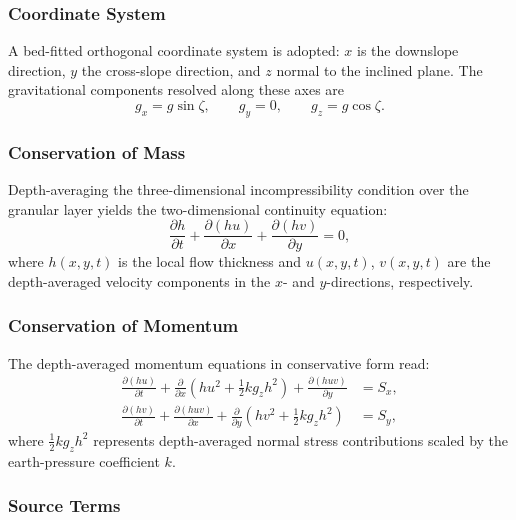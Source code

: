 \documentclass[10pt, conference]{FMFP2023}
\begin{document}
\subsubsection{Coordinate System}

A bed-fitted orthogonal coordinate system is adopted: $x$ is the
downslope direction, $y$ the cross-slope direction, and $z$ normal to
the inclined plane.
The gravitational components resolved along these axes are
\begin{equation}
    g_x = g\sin\zeta, \qquad g_y = 0, \qquad g_z = g\cos\zeta.
    \label{eq:gravity_components}
\end{equation}

\subsubsection{Conservation of Mass}

Depth-averaging the three-dimensional incompressibility condition over
the granular layer yields the two-dimensional continuity equation:
\begin{equation}
    \frac{\partial h}{\partial t}
    + \frac{\partial(hu)}{\partial x}
    + \frac{\partial(hv)}{\partial y} = 0,
    \label{eq:mass_2d}
\end{equation}
where $h(x,y,t)$ is the local flow thickness and $u(x,y,t)$,
$v(x,y,t)$ are the depth-averaged velocity components in the $x$- and
$y$-directions, respectively.

\subsubsection{Conservation of Momentum}

The depth-averaged momentum equations in conservative form read:
\begin{align}
    \frac{\partial(hu)}{\partial t}
    + \frac{\partial}{\partial x}\!\left(hu^2 + \tfrac{1}{2}kg_zh^2\right)
    + \frac{\partial(huv)}{\partial y}
    &= S_x,
    \label{eq:mom_x_2d} \\[4pt]
    \frac{\partial(hv)}{\partial t}
    + \frac{\partial(huv)}{\partial x}
    + \frac{\partial}{\partial y}\!\left(hv^2 + \tfrac{1}{2}kg_zh^2\right)
    &= S_y,
    \label{eq:mom_y_2d}
\end{align}
where $\tfrac{1}{2}kg_zh^2$ represents depth-averaged normal stress
contributions scaled by the earth-pressure coefficient $k$.

\subsubsection{Source Terms}
\end{document}

